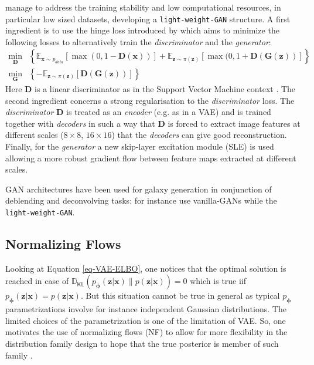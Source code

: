 \documentclass[11pt]{amsart}
\newcommand{\Esp}[0]{\ensuremath{\mathbb{E}}}
\newcommand{\DKL}[0]{\ensuremath{\mathbb{D}_{\mathsf{KL}}}}
\begin{document}
\cite{liu2021towards} manage to address the training stability and low  computational resources, in particular low sized datasets, developing a \texttt{light-weight-GAN} structure. A first ingredient is to use the hinge loss introduced by \cite{Lim2017} which aims to minimize the following losses to alternatively train the \textit{discriminator} and the \textit{generator}: 
\begin{align}
\min_{\bm{D}}& \left\{\Esp_{\bm{x}\sim p_{data}}[\max{(0,1-\bm{D}(\bm{x}))}] + \Esp_{\bm{z}\sim \pi(\bm{z})}[\max{(0,1+\bm{D}(\bm{G}(\bm{z}))}]
\right\}\\
\min_{\bm{G}} &\left\{-\Esp_{\bm{z}\sim \pi(\bm{z})}[\bm{D}(\bm{G}(\bm{z}))]
\right\}
\end{align}
Here $\bm{D}$ is a linear discriminator as in the Support Vector Machine context \citep{Vapnik1997}. The second ingredient concerns a strong regularisation to the \textit{discriminator} loss. The \textit{discriminator}  $\bm{D}$  is treated as an \textit{encoder} (e.g. as in a VAE) and is trained together with \textit{decoders} in such a way that $\bm{D}$ is forced to extract image features at different scales ($8\times 8$, $16\times 16$) that the \textit{decoders} can give good reconstruction. Finally, for the \textit{generator} a new skip-layer excitation module (SLE) is used allowing a more robust gradient flow between feature maps extracted at different scales.

GAN architectures have been used for galaxy generation in conjunction of deblending and deconvolving tasks: for instance \cite{Schawinski2017,Hemmati_2022} use vanilla-GANs while  \cite{Coccomini2021} the \texttt{light-weight-GAN}.
%
\subsection{Normalizing Flows}
%
Looking at Equation \ref{eq-VAE-ELBO}, one notices that the optimal solution is reached in case of $\DKL(p_{\bm{\phi}}(\bm{z}|\bm{x})\| p(\bm{z}|\bm{x}))=0$ which is true iif $p_{\bm{\phi}}(\bm{z}|\bm{x}) = p(\bm{z}|\bm{x})$. But this situation cannot be true in general as typical $p_{\bm{\phi}}$ parametrizations involve for instance independent Gaussian distributions. The limited choices of the parametrization is one of the limitation of VAE. So, one motivates the use of normalizing flows (NF) to allow for more flexibility in the distribution family design to hope that the true posterior is member of such family \citep{Tabak2010, Tabak2013a, Rezende2015}. 
\end{document}
